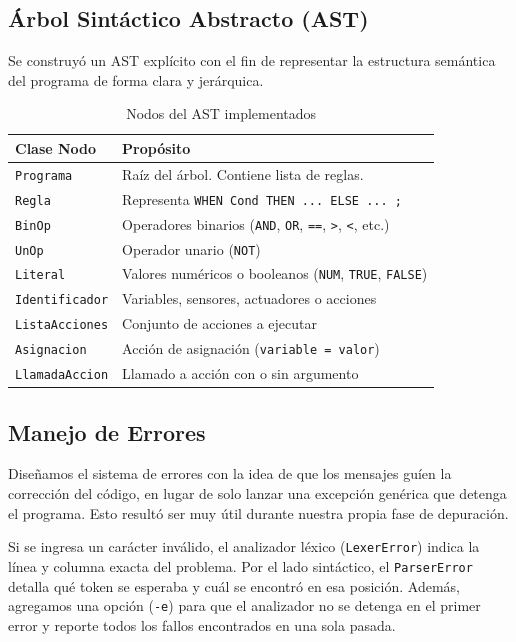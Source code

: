 \documentclass[12pt,a4paper]{article}
\begin{document}
\subsection{Árbol Sintáctico Abstracto (AST)}
Se construyó un AST explícito con el fin de representar la estructura semántica del programa de forma clara y jerárquica.

\begin{table}[H]
\centering
\begin{tabular}{|l|l|}
\hline
\textbf{Clase Nodo} & \textbf{Propósito} \\ 
\hline
\texttt{Programa} & Raíz del árbol. Contiene lista de reglas. \\ 
\hline
\texttt{Regla} & Representa \texttt{WHEN Cond THEN ... ELSE ... ;} \\ 
\hline
\texttt{BinOp} & Operadores binarios (\texttt{AND}, \texttt{OR}, \texttt{==}, \texttt{>}, \texttt{<}, etc.) \\ 
\hline
\texttt{UnOp} & Operador unario (\texttt{NOT}) \\ 
\hline
\texttt{Literal} & Valores numéricos o booleanos (\texttt{NUM}, \texttt{TRUE}, \texttt{FALSE}) \\ 
\hline
\texttt{Identificador} & Variables, sensores, actuadores o acciones \\ 
\hline
\texttt{ListaAcciones} & Conjunto de acciones a ejecutar \\ 
\hline
\texttt{Asignacion} & Acción de asignación (\texttt{variable = valor}) \\ 
\hline
\texttt{LlamadaAccion} & Llamado a acción con o sin argumento \\ 
\hline
\end{tabular}
\caption{Nodos del AST implementados}
\label{tab:ast}
\end{table}

\subsection{Manejo de Errores}
Diseñamos el sistema de errores con la idea de que los mensajes guíen la corrección del código, en lugar de solo lanzar una excepción genérica que detenga el programa. Esto resultó ser muy útil durante nuestra propia fase de depuración. 

\vspace{0.5cm}

Si se ingresa un carácter inválido, el analizador léxico (\texttt{LexerError}) indica la línea y columna exacta del problema. Por el lado sintáctico, el \texttt{ParserError} detalla qué token se esperaba y cuál se encontró en esa posición. Además, agregamos una opción (\texttt{-e}) para que el analizador no se detenga en el primer error y reporte todos los fallos encontrados en una sola pasada.
\end{document}
